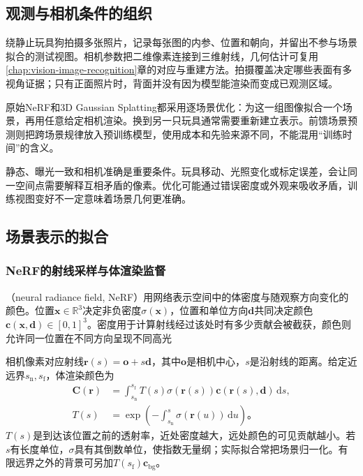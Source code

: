 \subsection{观测与相机条件的组织}
\label{sec:vision-generation-cameras}

绕静止玩具狗拍摄多张照片，记录每张图的内参、位置和朝向，并留出不参与场景拟合的测试视图。相机参数把二维像素连接到三维射线，几何估计可复用\ref{chap:vision-image-recognition}章的对应与重建方法。拍摄覆盖决定哪些表面有多视角证据；只有正面照片时，背面并没有因为模型能渲染而变成已观测区域。

原始NeRF和3D Gaussian Splatting都采用逐场景优化：为这一组图像拟合一个场景，再用任意给定相机渲染。换到另一只玩具通常需要重新建立表示。前馈场景预测则把跨场景规律放入预训练模型，使用成本和先验来源不同，不能混用“训练时间”的含义。

静态、曝光一致和相机准确是重要条件。玩具移动、光照变化或标定误差，会让同一空间点需要解释互相矛盾的像素。优化可能通过错误密度或外观来吸收矛盾，训练视图变好不一定意味着场景几何更准确。

\subsection{场景表示的拟合}
\label{sec:vision-generation-scene-fitting}

\Needspace{65mm}
\subsubsection{NeRF的射线采样与体渲染监督}
\label{sec:vision-generation-nerf}

（neural radiance field, NeRF）用网络表示空间中的体密度与随观察方向变化的颜色。位置$\bm{x}\in\mathbb{R}^3$决定非负密度$\sigma(\bm{x})$，位置和单位方向$\bm{d}$共同决定颜色$\bm{c}(\bm{x},\bm{d})\in[0,1]^3$。密度用于计算射线经过该处时有多少贡献会被截获，颜色则允许同一位置在不同方向呈现不同高光

相机像素对应射线$\bm{r}(s)=\bm{o}+s\bm{d}$，其中$\bm{o}$是相机中心，$s$是沿射线的距离。给定近远界$s_{\mathrm{n}},s_{\mathrm{f}}$，体渲染颜色为
\begin{equation}
 \begin{aligned}
 \bm{C}(\bm{r})
 &=\int_{s_{\mathrm{n}}}^{s_{\mathrm{f}}}
    T(s)\sigma(\bm{r}(s))
    \bm{c}(\bm{r}(s),\bm{d})\,\mathrm{d}s,\\
 T(s)&=\exp\!\left(
     -\int_{s_{\mathrm{n}}}^{s}\sigma(\bm{r}(u))\,\mathrm{d}u
    \right)\text{。}
 \end{aligned}
 \label{eq:vision-nerf-continuous}
\end{equation}
$T(s)$是到达该位置之前的透射率，近处密度越大，远处颜色的可见贡献越小。若$s$有长度单位，$\sigma$具有其倒数单位，使指数无量纲；实际拟合常把场景归一化。有限远界之外的背景可另加$T(s_{\mathrm{f}})\bm{c}_{\mathrm{bg}}$。

